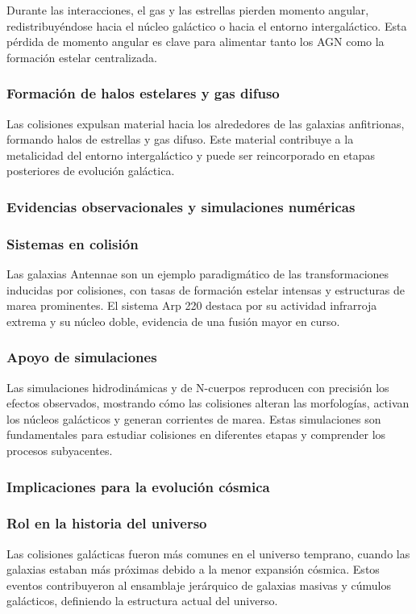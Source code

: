 \documentclass{article}
\begin{document}
Durante las interacciones, el gas y las estrellas pierden momento angular, redistribuyéndose hacia el núcleo galáctico o hacia el entorno intergaláctico.
Esta pérdida de momento angular es clave para alimentar tanto los AGN como la formación estelar centralizada.
\subsubsection*{Formación de halos estelares y gas difuso}

Las colisiones expulsan material hacia los alrededores de las galaxias anfitrionas, formando halos de estrellas y gas difuso. Este material contribuye a la metalicidad del entorno intergaláctico y puede ser reincorporado en etapas posteriores de evolución galáctica.
\subsubsection{Evidencias observacionales y simulaciones numéricas}
\subsubsection*{Sistemas en colisión}

Las galaxias Antennae son un ejemplo paradigmático de las transformaciones inducidas por colisiones, con tasas de formación estelar intensas y estructuras de marea prominentes.
El sistema Arp 220 destaca por su actividad infrarroja extrema y su núcleo doble, evidencia de una fusión mayor en curso.
\subsubsection*{Apoyo de simulaciones}

Las simulaciones hidrodinámicas y de N-cuerpos reproducen con precisión los efectos observados, mostrando cómo las colisiones alteran las morfologías, activan los núcleos galácticos y generan corrientes de marea. Estas simulaciones son fundamentales para estudiar colisiones en diferentes etapas y comprender los procesos subyacentes.
\subsubsection{Implicaciones para la evolución cósmica}
\subsubsection*{Rol en la historia del universo}

Las colisiones galácticas fueron más comunes en el universo temprano, cuando las galaxias estaban más próximas debido a la menor expansión cósmica.
Estos eventos contribuyeron al ensamblaje jerárquico de galaxias masivas y cúmulos galácticos, definiendo la estructura actual del universo.
\end{document}
